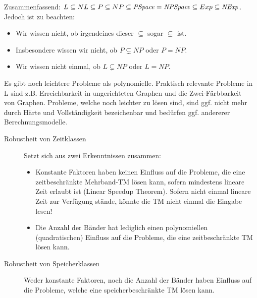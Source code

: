     Zusammenfassend: $L \subseteq NL \subseteq P \subseteq NP \subseteq \mathit{PSpace} = \mathit{NPSpace} \subseteq Exp \subseteq \mathit{NExp}$. \\
    Jedoch ist zu beachten:

    \begin{itemize}
        \setlength\itemsep{0em}
        \item Wir wissen nicht, ob irgendeines dieser $\subseteq$ sogar $\subsetneq$ ist.
        \item Insbesondere wissen wir nicht, ob $P \subsetneq NP$ oder $P = NP$.
        \item Wir wissen nicht einmal, ob $L \subsetneq NP$ oder $L = NP$.
    \end{itemize}

    Es gibt noch leichtere Probleme als polynomielle. Praktisch relevante Probleme in L sind z.B. Erreichbarkeit in ungerichteten Graphen und die Zwei-Färbbarkeit von Graphen.
    Probleme, welche noch leichter zu lösen sind, sind ggf. nicht mehr durch Härte und Vollständigkeit bezeichenbar und bedürfen ggf. andererer Berechnungsmodelle. 

    \begin{description}
        \item[Robustheit von Zeitklassen] Setzt sich aus zwei Erkenntnissen zusammen:
            \begin{itemize}
                \item Konstante Faktoren haben keinen Einfluss auf die Probleme, die eine zeitbeschränkte Mehrband-TM lösen kann, sofern mindestens lineare Zeit erlaubt ist (Linear Speedup Theorem). Sofern nicht einmal lineare Zeit zur Verfügung stände, könnte die TM nicht einmal die Eingabe lesen!
                \item Die Anzahl der Bänder hat lediglich einen polynomiellen (quadratischen) Einfluss auf die Probleme, die eine zeitbeschränkte TM lösen kann.
            \end{itemize}
        \item[Robustheit von Speicherklassen] Weder konstante Faktoren, noch die Anzahl der Bänder haben Einfluss auf die Probleme, welche eine speicherbeschränkte TM lösen kann.
    \end{description}
